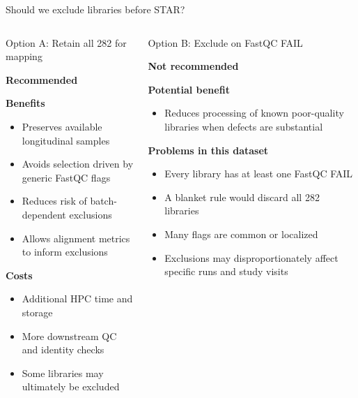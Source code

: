 \documentclass[10pt,aspectratio=169]{beamer}
\begin{document}
\begin{frame}{Should we exclude libraries before STAR?}
	
	\begin{columns}[T]
		
		
		\begin{block}{Option A: Retain all 282 for mapping}
			
			\small
			
			\textbf{\textcolor{mgtxteal}{Recommended}}
			
			\medskip
			
			\textbf{Benefits}
			\begin{itemize}
				\item Preserves available longitudinal samples
				\item Avoids selection driven by generic FastQC flags
				\item Reduces risk of batch-dependent exclusions
				\item Allows alignment metrics to inform exclusions
			\end{itemize}
			
			\textbf{Costs}
			\begin{itemize}
				\item Additional HPC time and storage
				\item More downstream QC and identity checks
				\item Some libraries may ultimately be excluded
			\end{itemize}
			
		\end{block}
		
		
		\begin{block}{Option B: Exclude on FastQC FAIL}
			
			\small
			
			\textbf{\textcolor{mgtxred}{Not recommended}}
			
			\medskip
			
			\textbf{Potential benefit}
			\begin{itemize}
				\item Reduces processing of known poor-quality
				libraries when defects are substantial
			\end{itemize}
			
			\textbf{Problems in this dataset}
			\begin{itemize}
				\item Every library has at least one FastQC FAIL
				\item A blanket rule would discard all 282 libraries
				\item Many flags are common or localized
				\item Exclusions may disproportionately affect
				specific runs and study visits
			\end{itemize}
			

\end{block}
\end{columns}
\end{frame}
\end{document}
